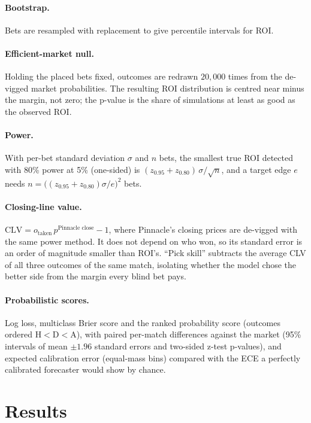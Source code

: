 \documentclass[11pt,a4paper]{article}
\begin{document}
\paragraph{Bootstrap.} Bets are resampled with replacement to give percentile intervals for ROI.
\paragraph{Efficient-market null.} Holding the placed bets fixed, outcomes are redrawn $20{,}000$ times from the de-vigged market probabilities. The resulting ROI distribution is centred near minus the margin, not zero; the p-value is the share of simulations at least as good as the observed ROI.
\paragraph{Power.} With per-bet standard deviation $\sigma$ and $n$ bets, the smallest true ROI detected with 80\% power at 5\% (one-sided) is $(z_{0.95}+z_{0.80})\,\sigma/\sqrt n$, and a target edge $e$ needs $n=\big((z_{0.95}+z_{0.80})\sigma/e\big)^2$ bets.
\paragraph{Closing-line value.} $\mathrm{CLV}=o_{\text{taken}}\,p^{\text{Pinnacle close}}-1$, where Pinnacle's closing prices are de-vigged with the same power method. It does not depend on who won, so its standard error is an order of magnitude smaller than ROI's. ``Pick skill'' subtracts the average CLV of all three outcomes of the same match, isolating whether the model chose the better side from the margin every blind bet pays.
\paragraph{Probabilistic scores.} Log loss, multiclass Brier score and the ranked probability score (outcomes ordered H$<$D$<$A), with paired per-match differences against the market (95\% intervals of mean $\pm1.96$ standard errors and two-sided z-test p-values), and expected calibration error (equal-mass bins) compared with the ECE a perfectly calibrated forecaster would show by chance.

\section{Results}\label{sec:results}
\end{document}
